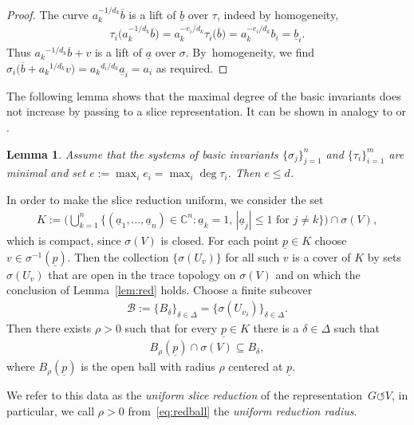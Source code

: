 \documentclass[11pt]{article}
\numberwithin{equation}{section}
\numberwithin{equation}{section}
\newtheorem{Lemma}[Theorem]{Lemma}
\def\de{\delta}
\def\rh{\rho}
\def\si{\sigma}
\def\ta{\tau}
\def\De{\Delta}
\def\C{\mathbb{C}}
\def\cB{\mathcal{B}}
\def\ul{\underline}
\def\acts{\circlearrowleft}
\begin{document}
\begin{proof}
 The curve $a_k^{-1/d_k} \overline b$ is a lift of $\underline b$ over $\ta$, indeed by homogeneity,
 \begin{gather*}
 \ta_i\big(a_k^{-1/d_k} \overline b\big) = a_k^{-e_i/d_k} \ta_i\big(\overline b\big)
 = a_k^{-e_i/d_k} b_i = \underline b_i.
 \end{gather*}
 Thus ${a_k}^{-1/d_k} \overline b + v$ is a lift of $\underline a$ over $\si$. By~homogeneity, we find $\si_i\big(\overline b + {a_k}^{1/d_k} v\big) = {a_k}^{d_i/d_k} \underline a_i = a_i$
 as required.
\end{proof}


The following lemma shows that the maximal degree of the basic invariants does not increase by
passing to a slice representation. It can be shown in analogy to \cite[Lemma 2.4]{KLMR06} or \cite{ParusinskiRainer14}.

\begin{Lemma} \label{lem:e}
 Assume that the systems of basic invariants $\{\si_j\}_{j=1}^n$ and $\{\ta_i\}_{i=1}^m$ are minimal and
 set $e := \max_{i} e_i = \max_{i} \deg \ta_i$. Then $e \le d$.
\end{Lemma}

In order to make the slice reduction uniform, we consider
the set
\begin{gather} \label{eq:compactK}
 K:= \bigg(\bigcup_{k=1}^n \big\{(\ul a_1, \dots,\ul a_n) \in \C^{n} \colon \ul a_k=1,\,|\ul a_j| \le 1 \text{ for }j \ne k\big\}\bigg) \cap \si(V),
\end{gather}
which is compact, since $\si(V)$ is closed. For each point $\underline p \in K$ choose $v \in \si^{-1}(\underline p)$.
Then the collection $\{\si(U_v)\}$ for all such $v$ is a cover of $K$ by sets $\si(U_v)$ that are open in the
trace topology on $\si(V)$
and on which
the conclusion of Lemma~\ref{lem:red} holds.
Choose a finite subcover
\begin{gather*} %
 \cB := \{B_\de\}_{\de \in \De} = \{\si(U_{v_\de})\}_{\de \in \De}.
\end{gather*}
Then there exists $\rh>0$ such that for every $\underline p \in K$ there is a $\de \in \De$ such that
\begin{gather} \label{eq:redball}
 B_\rh(\underline p) \cap \si(V) \subseteq B_{\de},
\end{gather}
where $B_\rh(\underline p)$ is the open ball with radius $\rh$ centered at $\ul p$.

\begin{Definition}
We refer to this data as the \emph{uniform slice reduction} of the representation~$G \acts V$,
in particular, we call $\rh>0$ from~\eqref{eq:redball} the \emph{uniform reduction radius}.
\end{Definition}
\end{document}
